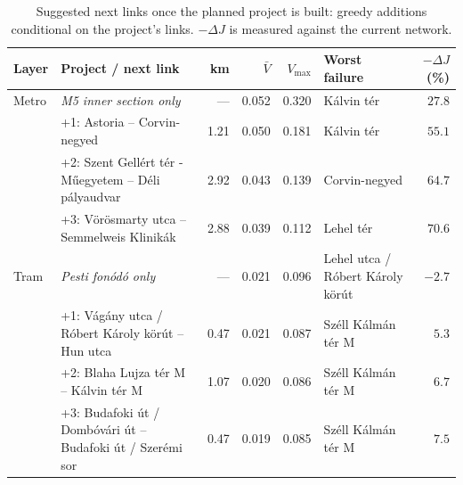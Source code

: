 \begin{table}[htbp]
\centering
\footnotesize
\begin{tabular}{l>{\raggedright\arraybackslash}p{5.4cm}rrr>{\raggedright\arraybackslash}p{3.0cm}r}
\toprule
Layer & Project / next link & km & $\bar V$ & $V_{\max}$ & Worst failure & $-\Delta J$ (\%) \\
\midrule
Metro & \emph{M5 inner section only} & --- & 0.052 & 0.320 & K\'alvin t\'er & $27.8$ \\
 & +1: Astoria -- Corvin-negyed & 1.21 & 0.050 & 0.181 & K\'alvin t\'er & $55.1$ \\
 & +2: Szent Gell\'ert t\'er - M\H{u}egyetem -- D\'eli p\'alyaudvar & 2.92 & 0.043 & 0.139 & Corvin-negyed & $64.7$ \\
 & +3: V\"or\"osmarty utca -- Semmelweis Klinik\'ak & 2.88 & 0.039 & 0.112 & Lehel t\'er & $70.6$ \\
\midrule
Tram & \emph{Pesti fon\'od\'o only} & --- & 0.021 & 0.096 & Lehel utca / R\'obert K\'aroly k\"or\'ut & $-2.7$ \\
 & +1: V\'ag\'any utca / R\'obert K\'aroly k\"or\'ut -- Hun utca & 0.47 & 0.021 & 0.087 & Sz\'ell K\'alm\'an t\'er M & $5.3$ \\
 & +2: Blaha Lujza t\'er M -- K\'alvin t\'er M & 1.07 & 0.020 & 0.086 & Sz\'ell K\'alm\'an t\'er M & $6.7$ \\
 & +3: Budafoki \'ut / Domb\'ov\'ari \'ut -- Budafoki \'ut / Szer\'emi sor & 0.47 & 0.019 & 0.085 & Sz\'ell K\'alm\'an t\'er M & $7.5$ \\
\bottomrule
\end{tabular}
\caption{Suggested next links once the planned project is built: greedy additions conditional on the project's links. $-\Delta J$ is measured against the current network.}
\label{tab:aug-next}
\end{table}

